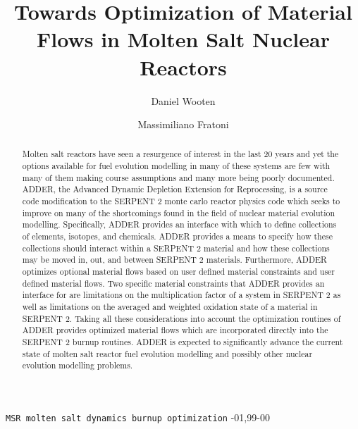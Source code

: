 \documentclass[]{elsarticle}
\begin{document}
\begin{frontmatter}

\title{Towards Optimization of Material Flows in Molten Salt Nuclear Reactors}


\author[ucb]{Daniel Wooten}
\author[ucb]{Massimiliano Fratoni}
\address[ucb]{4155 Etcheverry Hall, MC 1730, University of California, Berkeley,
    Berkeley, CA 94720-1730, United States}


\begin{abstract}
Molten salt reactors have seen a resurgence of interest in the last 20 years and
yet the options available for fuel evolution modelling in many of these systems
are few with many of them making course assumptions and many more being poorly
documented. ADDER, the Advanced Dynamic Depletion Extension for Reprocessing,
is a source code modification to the SERPENT 2 monte carlo reactor physics code
which seeks to improve on many of the shortcomings found in the field of
nuclear material evolution modelling. Specifically, ADDER provides an interface
with which to define collections of elements, isotopes, and chemicals. ADDER
provides a means to specify how these collections should interact within a
SERPENT 2 material and how these collections may be moved in, out, and between
SERPENT 2 materials. Furthermore, ADDER optimizes optional material flows based
on user defined material constraints and user defined material flows. Two 
specific material constraints that ADDER provides an interface for are
limitations on the multiplication factor of a system in SERPENT 2 as well as
limitations on the averaged and weighted oxidation state of a material in
SERPENT 2. Taking all these considerations into account the optimization
routines of ADDER provides optimized material flows  which are incorporated
directly into the SERPENT 2 burnup routines. ADDER is expected to significantly
advance the current state of molten salt reactor fuel evolution modelling and
possibly other nuclear evolution modelling problems.
\end{abstract}

\begin{keyword}
\texttt{MSR molten salt dynamics burnup optimization}
-01\sep  99-00
\end{keyword}

\end{frontmatter}

\linenumbers
\end{document}
